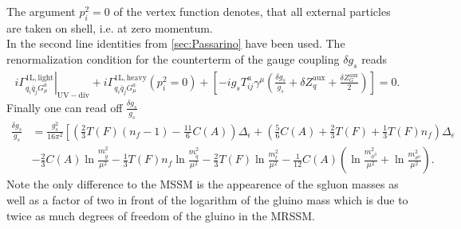 The argument $p_i^2=0$ of the vertex function denotes, that all external particles are taken on shell, i.e. at zero momentum.\\
In the second line identities from \ref{sec:Passarino} have been used. The renormalization condition for the counterterm of the gauge coupling $\delta g_s$ reads
\begin{align}
\left.i\Gamma^{\mathrm{1L,light}}_{q_i \overline{q}_j G_\mu^a}\right|_{\mathrm{UV-div}} + i\Gamma^{\mathrm{1L,heavy}}_{q_i \overline{q}_j G_\mu^a}(p_i^2=0) + \left[ -ig_s T^a_{ij}\gamma^\mu\left( \frac{\delta g_s}{g_s} + \delta Z_q^{\mathrm{aux}} + \frac{\delta Z_G^{\mathrm{aux}}}{2} \right)\right] = 0.
\end{align}
Finally one can read off $\frac{\delta g_s}{g_s}$
\begin{align}
\frac{\delta g_s}{g_s} &= \frac{g_s^2}{16\pi^2} \left[ \left( \frac{2}{3}T(F)(n_f-1) - \frac{11}{6}C(A) \right) \Delta_\epsilon + \left( \frac{5}{6}C(A) + \frac{2}{3}T(F) + \frac{1}{3}T(F)n_f \right)\Delta_\epsilon  \right.\nonumber\\
&- \frac{2}{3} C(A) \ln \frac{m_{\tilde{g}}^2}{\mu^2} - \frac{1}{3}T(F)n_f \ln \frac{m_{\tilde{q}}^2}{\mu^2} - \frac{2}{3}T(F) \ln \frac{m_t^2}{\mu^2}-\frac{1}{12} C(A) \left( \ln \frac{m_{\phi^0}^2}{\mu^2} + \ln \frac{m_{\sigma^0}^2}{\mu^2} \right).\label{eq:deltaGs}
\end{align}
Note the only difference to the MSSM\cite{Beenakker:1996ch} is the appearence of the sgluon masses as well as a factor of two in front of the logarithm of the gluino mass which is due to twice as much degrees of freedom of the gluino in the MRSSM.

